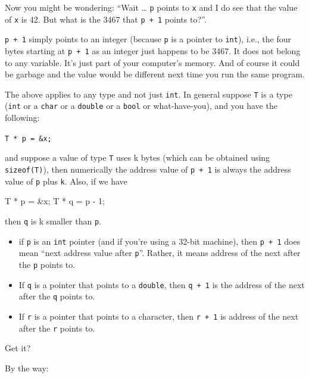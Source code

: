 Now you might be wondering: ``Wait \ldots{} \texttt{p} points to \texttt{x} and I do see that the value of \texttt{x} is 42. But what is the 3467 that \texttt{p + 1} points to?''.

\texttt{p + 1} simply points to an integer (because \texttt{p} is a pointer to \texttt{int}), i.e., the four bytes starting at \texttt{p + 1} as an integer just happens to be 3467. It does not belong to any variable. It's just part of your computer's memory. And of course it could be garbage and the value would be different next time you run the same program.

The above applies to any type and not just \texttt{int}. In general suppose \texttt{T} is a type (\texttt{int} or a \texttt{char} or a \texttt{double} or a \texttt{bool} or what-have-you), and you have the following:

\verb!T * p = &x;!

and suppose a value of type \texttt{T} uses k bytes (which can be obtained using \texttt{sizeof(T)}), then numerically the address value of \texttt{p + 1} is always the address value of \texttt{p} plus \texttt{k}. Also, if we have

\begin{consolethree}[escapeinside=||]
T * p = &x;
T * q = p - 1;
\end{consolethree}

then \texttt{q} is k smaller than \texttt{p}.


\begin{itemize}
\item if \texttt{p} is an \texttt{int} pointer (and if you're
  using a 32-bit machine), then \texttt{p + 1} does  mean
  ``next address value after \texttt{p}''. Rather, it means address of the
  next  after the  \texttt{p} points to.
\item If \texttt{q} is a pointer that points to a \texttt{double}, then \texttt{q
  + 1} is the address of the next  after the
   \texttt{q} points to.
\item If \texttt{r} is a pointer that points to a character, then \texttt{r + 1}
  is address of the next  after the 
  \texttt{r} points to.
\end{itemize}

Get it?

By the way:

